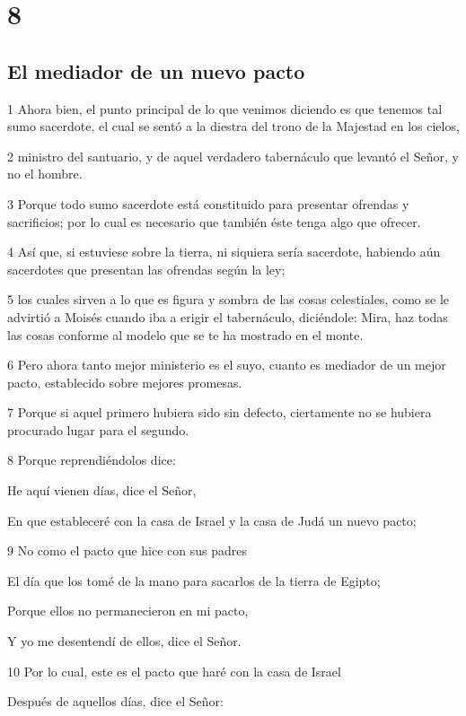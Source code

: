 \chapter{8}

\section*{El mediador de un nuevo pacto}

\par 1 Ahora bien, el punto principal de lo que venimos diciendo es que tenemos tal sumo sacerdote, el cual se sentó a la diestra del trono de la Majestad en los cielos,
\par 2 ministro del santuario, y de aquel verdadero tabernáculo que levantó el Señor, y no el hombre.
\par 3 Porque todo sumo sacerdote está constituido para presentar ofrendas y sacrificios; por lo cual es necesario que también éste tenga algo que ofrecer.
\par 4 Así que, si estuviese sobre la tierra, ni siquiera sería sacerdote, habiendo aún sacerdotes que presentan las ofrendas según la ley;
\par 5 los cuales sirven a lo que es figura y sombra de las cosas celestiales, como se le advirtió a Moisés cuando iba a erigir el tabernáculo, diciéndole: Mira, haz todas las cosas conforme al modelo que se te ha mostrado en el monte.
\par 6 Pero ahora tanto mejor ministerio es el suyo, cuanto es mediador de un mejor pacto, establecido sobre mejores promesas.
\par 7 Porque si aquel primero hubiera sido sin defecto, ciertamente no se hubiera procurado lugar para el segundo.
\par 8 Porque reprendiéndolos dice:
\par He aquí vienen días, dice el Señor,
\par En que estableceré con la casa de Israel y la casa de Judá un nuevo pacto;
\par 9 No como el pacto que hice con sus padres
\par El día que los tomé de la mano para sacarlos de la tierra de Egipto;
\par Porque ellos no permanecieron en mi pacto,
\par Y yo me desentendí de ellos, dice el Señor.
\par 10 Por lo cual, este es el pacto que haré con la casa de Israel
\par Después de aquellos días, dice el Señor:
